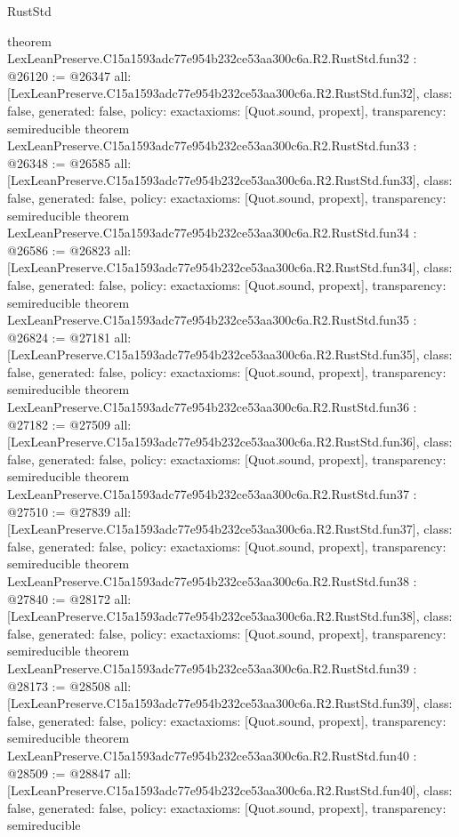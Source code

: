 \begin{lexlean}{RustStd}
\begin{coremodule}
{}
theorem LexLeanPreserve.C15a1593adc77e954b232ce53aa300c6a.R2.RustStd.fun32 : @26120 := @26347 {
  all: [LexLeanPreserve.C15a1593adc77e954b232ce53aa300c6a.R2.RustStd.fun32],
  class: false,
  generated: false,
  policy: exact{axioms: [Quot.sound, propext]},
  transparency: semireducible
}
theorem LexLeanPreserve.C15a1593adc77e954b232ce53aa300c6a.R2.RustStd.fun33 : @26348 := @26585 {
  all: [LexLeanPreserve.C15a1593adc77e954b232ce53aa300c6a.R2.RustStd.fun33],
  class: false,
  generated: false,
  policy: exact{axioms: [Quot.sound, propext]},
  transparency: semireducible
}
theorem LexLeanPreserve.C15a1593adc77e954b232ce53aa300c6a.R2.RustStd.fun34 : @26586 := @26823 {
  all: [LexLeanPreserve.C15a1593adc77e954b232ce53aa300c6a.R2.RustStd.fun34],
  class: false,
  generated: false,
  policy: exact{axioms: [Quot.sound, propext]},
  transparency: semireducible
}
theorem LexLeanPreserve.C15a1593adc77e954b232ce53aa300c6a.R2.RustStd.fun35 : @26824 := @27181 {
  all: [LexLeanPreserve.C15a1593adc77e954b232ce53aa300c6a.R2.RustStd.fun35],
  class: false,
  generated: false,
  policy: exact{axioms: [Quot.sound, propext]},
  transparency: semireducible
}
theorem LexLeanPreserve.C15a1593adc77e954b232ce53aa300c6a.R2.RustStd.fun36 : @27182 := @27509 {
  all: [LexLeanPreserve.C15a1593adc77e954b232ce53aa300c6a.R2.RustStd.fun36],
  class: false,
  generated: false,
  policy: exact{axioms: [Quot.sound, propext]},
  transparency: semireducible
}
theorem LexLeanPreserve.C15a1593adc77e954b232ce53aa300c6a.R2.RustStd.fun37 : @27510 := @27839 {
  all: [LexLeanPreserve.C15a1593adc77e954b232ce53aa300c6a.R2.RustStd.fun37],
  class: false,
  generated: false,
  policy: exact{axioms: [Quot.sound, propext]},
  transparency: semireducible
}
theorem LexLeanPreserve.C15a1593adc77e954b232ce53aa300c6a.R2.RustStd.fun38 : @27840 := @28172 {
  all: [LexLeanPreserve.C15a1593adc77e954b232ce53aa300c6a.R2.RustStd.fun38],
  class: false,
  generated: false,
  policy: exact{axioms: [Quot.sound, propext]},
  transparency: semireducible
}
theorem LexLeanPreserve.C15a1593adc77e954b232ce53aa300c6a.R2.RustStd.fun39 : @28173 := @28508 {
  all: [LexLeanPreserve.C15a1593adc77e954b232ce53aa300c6a.R2.RustStd.fun39],
  class: false,
  generated: false,
  policy: exact{axioms: [Quot.sound, propext]},
  transparency: semireducible
}
theorem LexLeanPreserve.C15a1593adc77e954b232ce53aa300c6a.R2.RustStd.fun40 : @28509 := @28847 {
  all: [LexLeanPreserve.C15a1593adc77e954b232ce53aa300c6a.R2.RustStd.fun40],
  class: false,
  generated: false,
  policy: exact{axioms: [Quot.sound, propext]},
  transparency: semireducible
}
\end{coremodule}
\end{lexlean}
